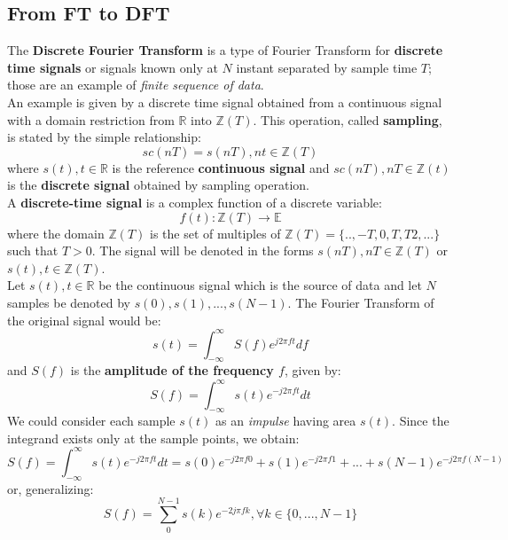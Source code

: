 \documentclass[10pt,a4paper]{report}
\theoremstyle{definition}
\begin{document}
\subsection{From FT to DFT}
The \textbf{Discrete Fourier Transform} is a type of Fourier Transform for \textbf{discrete time signals} or signals known only at $N$ instant separated by sample time $T$; those are an example of \textit{finite sequence of data}. \\
An example is given by a discrete time signal obtained from a continuous signal with a domain restriction from $\mathbb{R}$ into $\mathbb{Z}(T)$. This operation, called \textbf{sampling}, is stated by the simple relationship:
\begin{equation}
	sc(nT) = s(nT), nt \in \mathbb{Z}(T)
\end{equation}
where $s(t), t \in \mathbb{R}$ is the reference \textbf{continuous signal} and $sc(nT), nT \in \mathbb{Z}(t)$ is the \textbf{discrete signal} obtained by sampling operation.\\
A \textbf{discrete-time signal} is a complex function of a discrete variable:
\begin{equation}
	f(t): \mathbb{Z}(T) \rightarrow \mathbb{E}
\end{equation}
where the domain $\mathbb{Z}(T)$ is the set of multiples of $\mathbb{Z}(T) = \{.., -T, 0, T, T2, ...\}$ such that $T > 0$. The signal will be denoted in the forms $s(nT), nT \in \mathbb{Z}(T)$ or $s(t), t \in \mathbb{Z}(T)$.\\
Let $s(t), t \in \mathbb{R}$ be the continuous signal which is the source of data and let $N$ samples be denoted by $s(0), s(1), ..., s(N-1)$. The Fourier Transform of the original signal would be:
\begin{equation}
s(t) = \int_{-\infty}^{\infty} S(f)e^{j2\pi ft} df
\end{equation}
and $S(f)$ is the \textbf{amplitude of the frequency $f$}, given by:
\begin{equation}
	S(f) = \int_{-\infty}^{\infty} s(t)e^{-j2\pi ft} dt
\end{equation}
 We could consider each sample $s(t)$ as an \textit{impulse} having area $s(t)$. Since the integrand exists only at the sample points, we obtain:
 \begin{equation}
 	S(f) = \int_{-\infty}^{\infty} s(t)e^{-j2\pi ft} dt = s(0)e^{-j2\pi f0} + s(1)e^{-j2\pi f1} + ... + s(N-1)e^{-j2\pi f(N-1)}    
 \end{equation}
or, generalizing:
\begin{equation}
	S(f) = \sum_{0}^{N-1} s(k)e^{-2j\pi fk}, \forall k \in \{0, ..., N-1\}
\end{equation}
 
\end{document}
